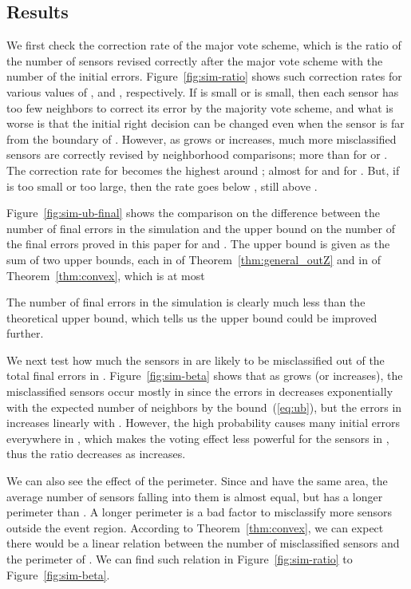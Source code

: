 \documentclass{article}
\begin{document}
\subsection{Results}

We first check the correction rate of the major vote scheme, which is the ratio of the number of sensors revised correctly after the major vote scheme with the number of the initial errors. Figure~\ref{fig:sim-ratio} shows such correction rates for various values of ,  and , respectively. If  is small or  is small, then each sensor has too few neighbors to correct its error by the majority vote scheme, and what is worse is that the initial right decision can be changed even when the sensor is far from the boundary of . However, as  grows or  increases, much more misclassified sensors are correctly revised by neighborhood comparisons; more than  for  or . The correction rate for  becomes the highest around ; almost  for  and  for . But, if  is too small or too large, then the rate goes below , still above .


\par
Figure~\ref{fig:sim-ub-final} shows the comparison on the difference between the number of final errors in the simulation and the upper bound on the number of the final errors proved in this paper for  and . The upper bound is given as the sum of two upper bounds, each in  of Theorem~\ref{thm:general_outZ} and in  of Theorem~\ref{thm:convex}, which is at most

The number of final errors in the simulation is clearly much less than the theoretical upper bound, which tells us the upper bound could be improved further.

\par
We next test how much the sensors in  are likely to be misclassified out of the total final errors in . Figure~\ref{fig:sim-beta} shows that as  grows (or  increases), the misclassified sensors occur mostly in  since the errors in  decreases exponentially with the expected number of neighbors  by the bound~(\ref{eq:ub}), but the errors in  increases linearly with . However, the high probability  causes many initial errors everywhere in , which makes the voting effect less powerful for the sensors in , thus the ratio decreases as  increases.

We can also see the effect of the perimeter. Since  and  have the same area, the average number of sensors falling into them is almost equal, but  has a  longer perimeter than . A longer perimeter is a bad factor to misclassify more sensors outside the event region. According to Theorem~\ref{thm:convex}, we can expect there would be a linear relation between the number of misclassified sensors and the perimeter of . We can find such relation in Figure~\ref{fig:sim-ratio} to Figure~\ref{fig:sim-beta}.
\end{document}
